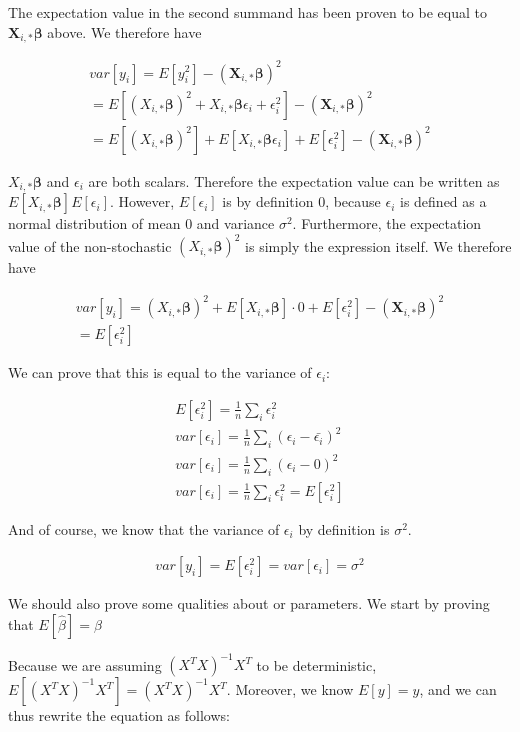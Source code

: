 \documentclass[twocolumn,10pt,cleanfoot]{asme2ej}
\begin{document}
The expectation value in the second summand has been proven to be equal to $\bm{X}_{i,*}\bm{\beta}$ above. We therefore have

\begin{gather}
var[y_i] = E[y_i^2] - (\bm{X}_{i,*}\bm{\beta})^2  \\
= E\left[(X_{i,*}\bm{\beta})^2 + X_{i,*}\bm{\beta}\epsilon_i + \epsilon_i^2\right] - (\bm{X}_{i,*}\bm{\beta})^2  \\
= E\left[(X_{i,*}\bm{\beta})^2\right] + E[X_{i,*}\bm{\beta}\epsilon_i] + E[\epsilon_i^2] - (\bm{X}_{i,*}\bm{\beta})^2
\end{gather}

$X_{i,*}\bm{\beta}$ and $\epsilon_i$ are both scalars. Therefore the expectation value can be written as $E[X_{i,*}\bm{\beta}]E[\epsilon_i]$. However, $E[\epsilon_i]$ is by definition $0$, because $\epsilon_i$ is defined as a normal distribution of mean $0$ and variance $\sigma^2$. Furthermore, the expectation value of the non-stochastic $(X_{i,*}\bm{\beta})^2$ is simply the expression itself. We therefore have

\begin{gather}
var[y_i] = (X_{i,*}\bm{\beta})^2 + E[X_{i,*}\bm{\beta}]\cdot 0 + E[\epsilon_i^2] - (\bm{X}_{i,*}\bm{\beta})^2  \\
= E[\epsilon_i^2]
\end{gather}

We can prove that this is equal to the variance of $\epsilon_i$:

\begin{gather}
E[\epsilon_i^2] = \frac{1}{n} \sum_i \epsilon_i^2 \\
var[\epsilon_i] = \frac{1}{n} \sum_i (\epsilon_i - \bar{\epsilon_i})^2 \\
var[\epsilon_i] = \frac{1}{n} \sum_i (\epsilon_i - 0)^2 \\
var[\epsilon_i] = \frac{1}{n} \sum_i \epsilon_i^2 = E[\epsilon_i^2]
\end{gather}

And of course, we know that the variance of $\epsilon_i$ by definition is $\sigma^2$.

\begin{gather}
var[y_i] = E[\epsilon_i^2] = var[\epsilon_i] = \sigma^2 
\end{gather}

We should also prove some qualities about or parameters. We start by proving that $E[\hat{\beta}] = \beta$

Because we are assuming $(X^{T}X)^{-1}X^{T}$ to be deterministic, $E[(X^{T}X)^{-1}X^{T}] = (X^{T}X)^{-1}X^{T}$. Moreover, we know $E[y] = y$, and we can thus rewrite the equation as follows:
\end{document}
